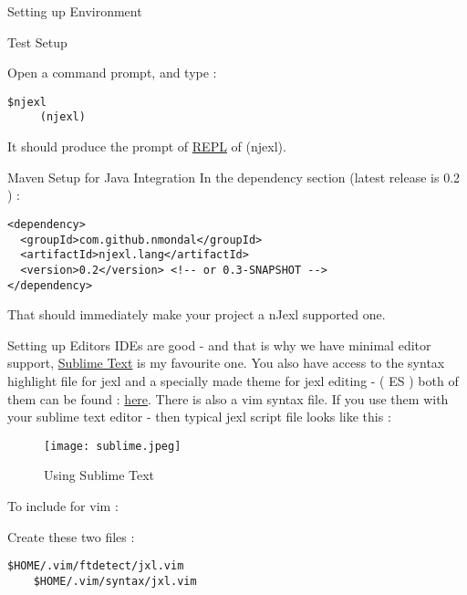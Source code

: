 \begin{section}{Setting up Environment}
\begin{subsection}{Test Setup}

Open a command prompt, and type :

\begin{lstlisting}[style=all]
     $njexl 
     (njexl)
\end{lstlisting}     

It should produce the prompt of \href{https://en.wikipedia.org/wiki/Read?eval?print_loop}{REPL} of (njexl).

\end{subsection} 

\begin{subsection}{Maven Setup for Java Integration}
In the dependency section (latest release is 0.2 ) : 

\begin{lstlisting}[style=XmlStyle]
<dependency>
  <groupId>com.github.nmondal</groupId>
  <artifactId>njexl.lang</artifactId>
  <version>0.2</version> <!-- or 0.3-SNAPSHOT -->
</dependency>
\end{lstlisting}

That should immediately make your project a nJexl supported one. 
\end{subsection} 


\begin{subsection}{Setting up Editors}
IDEs are good - and that is why we have minimal editor support, \href{http://www.sublimetext.com}{Sublime Text} is my favourite one. 
You also have access to the syntax highlight file for jexl and a specially made theme for jexl editing - ( ES ) both of them can be found :   \href{https://github.com/nmondal/njexl/tree/master/doc}{here}. 
There is also a vim syntax file.
If you use them with your sublime text editor - then typical jexl script file looks like this : 

\begin{figure}
\begin{center}
\leavevmode
\texttt{[image: sublime.jpeg]}
\end{center}
\caption{Using Sublime Text}
\label{fig_2_1}
\end{figure}

To include for vim :

Create these two files :

\begin{lstlisting}[style=all]
    $HOME/.vim/ftdetect/jxl.vim
    $HOME/.vim/syntax/jxl.vim
\end{lstlisting}


\end{subsection}
\end{section}
